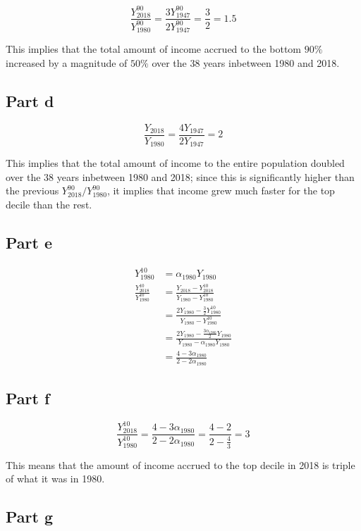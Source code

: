 \documentclass[12pt,letterpaper]{article}
\theoremstyle{definition}
\begin{document}
\[
  \frac{Y_{2018}^{90}}{Y_{1980}^{90}} = \frac{3Y_{1947}^{90}}{2Y_{1947}^{90}}
  = \frac{3}{2} = 1.5
\]

This implies that the total amount of income accrued to the bottom $90\%$
increased by a magnitude of $50\%$ over the $38$ years inbetween 1980 and 2018.

\subsection*{Part d}

\[
  \frac{Y_{2018}}{Y_{1980}} = \frac{4Y_{1947}}{2Y_{1947}} = 2
\]


This implies that the total amount of income to the entire population doubled
over the $38$ years inbetween 1980 and 2018; since this is significantly higher
than the previous $Y_{2018}^{90} / Y_{1980}^{90}$, it implies that income grew
much faster for the top decile than the rest.

\subsection*{Part e}

\begin{align*}
  Y_{1980}^{10} &= \alpha_{1980}Y_{1980} \\
  \frac{Y_{2018}^{10}}{Y_{1980}^{10}} &= \frac{Y_{2018} -
    Y_{2018}^{10}}{Y_{1980} - Y_{1980}^{10}} \\
                &= \frac{2Y_{1980} - \frac{3}{2}Y_{1980}^{10}}{Y_{1980} - Y_{1980}^{10}} \\
                &= \frac{2Y_{1980} - \frac{3\alpha_{1980}}{2}Y_{1980}}{Y_{1980} - \alpha_{1980}Y_{1980}} \\
                &= \frac{4 - 3\alpha_{1980}}{2 - 2\alpha_{1980}}
\end{align*}

\subsection*{Part f}

\[
  \frac{Y_{2018}^{10}}{Y_{1980}^{10}} = \frac{4 - 3\alpha_{1980}}{2 -
    2\alpha_{1980}} = \frac{4 - 2}{2 - \frac{4}{3}} = 3
\]

This means that the amount of income accrued to the top decile in 2018 is triple of what
it was in 1980.

\subsection*{Part g}
\end{document}
